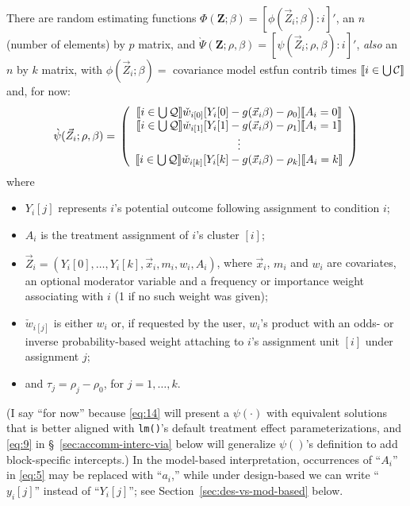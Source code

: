 \documentclass{article}
\DeclarePairedDelimiter{\indicator}{\llbracket}{\rrbracket}
\newcommand{\owt}[1][{[a_i]}]{\ensuremath{\check{w}_{i#1}}}
\begin{document}
There are random estimating functions $\Phi(\mathbf{Z}; \beta ) =
[\phi(\vec{Z}_{i};
\beta) : i]'$, an $n$ (number of elements) by $p$ matrix,  and 
       $\grave{\Psi}(\mathbf{Z}; \rho, \beta) = [\psi(\vec{Z}_{i};
       \rho, \beta): i]'$, \textit{also} an $n$ by $k$ matrix, with 
       $\phi(\vec{Z}_{i}; \beta)=$ covariance model estfun
       contrib times $\indicator{i \in \bigcup \mathcal{C}}$ and, for
       now:
\begin{equation}
         \label{eq:5}
         \grave{\psi}(\vec{Z}_{i}; \rho, \beta) =\\
         \left( \begin{array}{c}
           \indicator{i \in \bigcup \mathcal{Q}}\owt[{[0]}] [Y_{i}[0] - g(\vec{x}_{i}\beta)-
                  \rho_{0}]\indicator{A_{i}=0}\\
           \indicator{i \in \bigcup \mathcal{Q}}\owt[{[1]}] [Y_{i}[1] - g(\vec{x}_{i}\beta)-
                  \rho_{1}]\indicator{A_{i}=1}\\
                  \vdots \\
           \indicator{i \in \bigcup \mathcal{Q}}\owt[{[k]}] [Y_{i}[k] - g(\vec{x}_{i}\beta)-
                  \rho_{k}]\indicator{A_{i}=k}\\
                \end{array}\right)
\end{equation}
where
\begin{itemize}
\item $Y_{i}[j]$ represents $i$'s potential outcome following
  assignment to condition $i$;
\item $A_i$ is the treatment assignment of $i$'s cluster $[i]$;
\item $\vec{Z}_i = (Y_i[0],\ldots, Y_{i}[k], \vec{x}_i, m_{i}, w_i, A_i)$, where $\vec{x}_i$, $m_{i}$ and $w_i$ are covariates, an optional moderator variable and a
  frequency or importance weight associating with $i$ (1 if no such weight was
  given); 
\item $\owt[{[j]}]$ is either $w_i$ or, 
   if requested by the user, $w_{i}$'s product with an
  odds- or inverse probability-based weight attaching to $i$'s
  assignment unit $[i]$ under assignment $j$;
\item and $\tau_{j} = \rho_{j}-\rho_{0}$, for $j=1,
\ldots, k$.
\end{itemize}
(I say ``for now'' because \eqref{eq:14} will present a
$\psi(\cdot)$ with equivalent solutions that is better aligned with
\texttt{lm()}'s default treatment effect parameterizations, and
\eqref{eq:9} in \S~\ref{sec:accomm-interc-via} below will generalize $\psi()$'s definition
to add block-specific intercepts.)
In the model-based interpretation, occurrences of ``$A_{i}$'' in \eqref{eq:5} may be replaced with ``$a_{i}$,'' while under design-based we can write ``$y_{i}[j]$'' instead of ``$Y_{i}[j]$''; see Section~\ref{sec:des-vs-mod-based} below.
\end{document}
